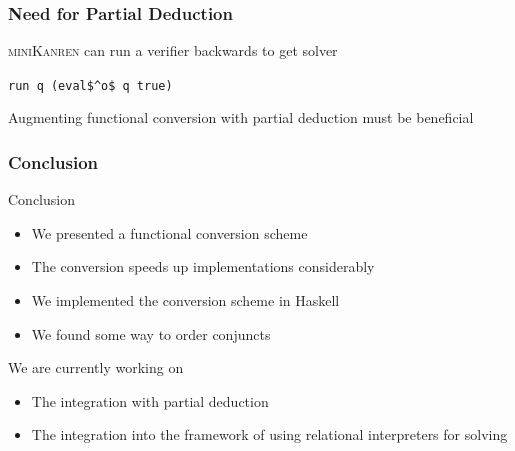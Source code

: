 \documentclass[xcolor=table]{beamer}
\newcommand{\mk}{\textsc{miniKanren}\xspace}
\begin{document}
\begin{frame}[fragile]
  \frametitle{Need for Partial Deduction}

\begin{center}
\mk can run a verifier backwards to get solver
\end{center}

\begin{center}
\begin{minipage}{0.3\textwidth}
  \lstinline{run q (eval$^o$ q true)}
\end{minipage}

\begin{center}
  Augmenting functional conversion with partial deduction must be beneficial
\end{center}
\end{center}


\end{frame}


\begin{frame}[fragile]
  \frametitle{Conclusion}
Conclusion
  \begin{itemize}
    \item We presented a functional conversion scheme
    \item The conversion speeds up implementations considerably
    \item We implemented the conversion scheme in Haskell
    \item We found some way to order conjuncts
  \end{itemize}

\vfill

We are currently working on
  \begin{itemize}
    \item The integration with partial deduction
    \item The integration into the framework of using relational interpreters for solving
  \end{itemize}
\end{frame}
\end{document}
